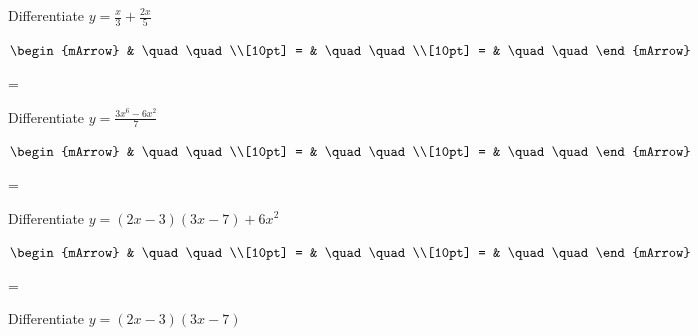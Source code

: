 \begin{mtask}[resume]
	\task \begin{exercise} Differentiate $y=\frac{x}{3}+\frac{2x}{5} $
           \begin{envSolution}
             $\begin{mArrow}
                   & \quad \quad              \\[10pt]
		   		 = & \quad \quad              \\[10pt]
				 = & \quad \quad 
              \end{mArrow}$
            \begin{shortsolution}  
			     =$ \quad \quad \quad \quad$
			\end{shortsolution}				 
           \end{envSolution}
         \end{exercise}
	\task \begin{exercise} Differentiate $y=\frac{3x^6-6x^2}{7} $
           \begin{envSolution}
             $\begin{mArrow}
                   & \quad \quad              \\[10pt]
		   		 = & \quad \quad              \\[10pt]
				 = & \quad \quad 
              \end{mArrow}$
            \begin{shortsolution}  
			     =$ \quad \quad \quad \quad$
			\end{shortsolution}				 
           \end{envSolution}
         \end{exercise}
	\task \begin{exercise} Differentiate $y=(2x-3)(3x-7)+6x^2 $
           \begin{envSolution}
             $\begin{mArrow}
                   & \quad \quad              \\[10pt]
		   		 = & \quad \quad              \\[10pt]
				 = & \quad \quad 
              \end{mArrow}$
            \begin{shortsolution}  
			     =$ \quad \quad \quad \quad$
			\end{shortsolution}				 
           \end{envSolution}
         \end{exercise}
	\task \begin{exercise} Differentiate $y=(2x-3)(3x-7) $

\end{exercise}
\end{mtask}
